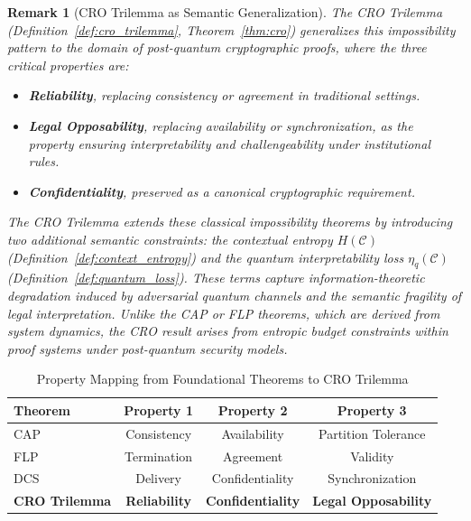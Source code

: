 \documentclass[preprint,12pt]{elsarticle}
\newtheorem{remark}{Remark}[section]
\begin{document}
            \begin{remark}[CRO Trilemma as Semantic Generalization]\label{rem:cro_generalization}
            The CRO Trilemma (Definition~\ref{def:cro_trilemma}, Theorem~\ref{thm:cro}) generalizes this impossibility pattern to the domain of post-quantum cryptographic proofs, where the three critical properties are:
            \begin{itemize}
                \item \textbf{Reliability}, replacing consistency or agreement in traditional settings.
                \item \textbf{Legal Opposability}, replacing availability or synchronization, as the property ensuring interpretability and challengeability under institutional rules.
                \item \textbf{Confidentiality}, preserved as a canonical cryptographic requirement.
            \end{itemize}
            The CRO Trilemma extends these classical impossibility theorems by introducing two additional semantic constraints: the \textit{contextual entropy} $H(\mathcal{C})$ (Definition~\ref{def:context_entropy}) and the \textit{quantum interpretability loss} $\eta_q(\mathcal{C})$ (Definition~\ref{def:quantum_loss}). These terms capture information-theoretic degradation induced by adversarial quantum channels and the semantic fragility of legal interpretation. Unlike the CAP or FLP theorems, which are derived from system dynamics, the CRO result arises from entropic budget constraints within proof systems under post-quantum security models.
            \end{remark}

            \begin{table}[H]
                \centering
                \caption{Property Mapping from Foundational Theorems to CRO Trilemma}
                \label{tab:theorem_mapping}
                \begin{tabular}{lccc}
                    \toprule
                    \textbf{Theorem} & \textbf{Property 1} & \textbf{Property 2} & \textbf{Property 3} \\
                    \midrule
                    CAP & Consistency & Availability & Partition Tolerance \\
                    FLP & Termination & Agreement & Validity \\
                    DCS & Delivery & Confidentiality & Synchronization \\
                    \midrule
                    \textbf{CRO Trilemma} & \textbf{Reliability} & \textbf{Confidentiality} & \textbf{Legal Opposability} \\
                    \bottomrule
                \end{tabular}
            \end{table}
\end{document}

